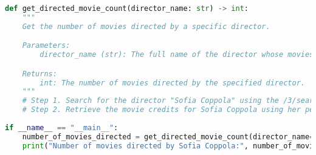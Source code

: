 \begin{figure*}[htbp]
\centering
\begin{lstlisting}[language=python, basicstyle=\ttfamily\tiny]
def get_directed_movie_count(director_name: str) -> int:
    """
    Get the number of movies directed by a specific director.

    Parameters:
        director_name (str): The full name of the director whose movies to count.

    Returns:
        int: The number of movies directed by the specified director.
    """
    # Step 1. Search for the director "Sofia Coppola" using the /3/search/person API to find her person_id.
    # Step 2. Retrieve the movie credits for Sofia Coppola using her person_id with the /3/person/{person_id}/movie_credits API.
    
if __name__ == "__main__":
    number_of_movies_directed = get_directed_movie_count(director_name="Sofia Coppola")
    print("Number of movies directed by Sofia Coppola:", number_of_movies_directed)
\end{lstlisting}
\caption{An example of the task decomposition result $c_{\boldsymbol{s}}$ generated by \texttt{ToolCoder} for the query: \textit{give me the number of movies directed by Sofia Coppola}.}
\label{app:code_comment_example}
\end{figure*}